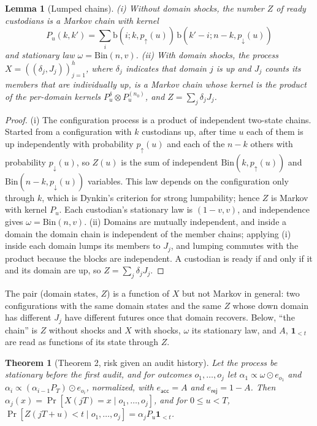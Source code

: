 \documentclass[11pt]{article}
\newtheorem*{lemmaS}{Lemma}
\newtheorem*{theoremS}{Theorem}
\begin{document}
\begin{lemmaS}[Lumped chains]
(i) Without domain shocks, the number $Z$ of ready custodians is a Markov chain with kernel
\[
P_u(k,k')=\sum_i\mathrm{b}(i;k,p_{\uparrow}(u))\,\mathrm{b}(k'-i;n-k,p_{\downarrow}(u))
\]
and stationary law $\omega=\mathrm{Bin}(n,v)$. (ii) With domain shocks, the process $X=((\delta_j,J_j))_{j=1}^{h}$, where $\delta_j$ indicates that domain $j$ is up and $J_j$ counts its members that are individually up, is a Markov chain whose kernel is the product of the per-domain kernels $P^{\delta}_u\otimes P^{(n_0)}_u$, and $Z=\sum_j\delta_jJ_j$.
\end{lemmaS}

\begin{proof}
(i) The configuration process is a product of independent two-state chains. Started from a configuration with $k$ custodians up, after time $u$ each of them is up independently with probability $p_{\uparrow}(u)$ and each of the $n-k$ others with probability $p_{\downarrow}(u)$, so $Z(u)$ is the sum of independent $\mathrm{Bin}(k,p_{\uparrow}(u))$ and $\mathrm{Bin}(n-k,p_{\downarrow}(u))$ variables. This law depends on the configuration only through $k$, which is Dynkin's criterion for strong lumpability; hence $Z$ is Markov with kernel $P_u$. Each custodian's stationary law is $(1-v,v)$, and independence gives $\omega=\mathrm{Bin}(n,v)$. (ii) Domains are mutually independent, and inside a domain the domain chain is independent of the member chains; applying (i) inside each domain lumps its members to $J_j$, and lumping commutes with the product because the blocks are independent. A custodian is ready if and only if it and its domain are up, so $Z=\sum_j\delta_jJ_j$.
\end{proof}

\noindent The pair (domain states, $Z$) is a function of $X$ but not Markov in general: two configurations with the same domain states and the same $Z$ whose down domain has different $J_j$ have different futures once that domain recovers. Below, ``the chain'' is $Z$ without shocks and $X$ with shocks, $\omega$ its stationary law, and $A$, $\mathbf{1}_{<t}$ are read as functions of its state through $Z$.

\begin{theoremS}[Theorem 2, risk given an audit history]
Let the process be stationary before the first audit, and for outcomes $o_1,\dots,o_j$ let $\alpha_1\propto\omega\odot e_{o_1}$ and $\alpha_i\propto(\alpha_{i-1}P_T)\odot e_{o_i}$, normalized, with $e_{\mathsf{acc}}=A$ and $e_{\mathsf{rej}}=1-A$. Then $\alpha_j(x)=\Pr[X(jT)=x\mid o_1,\dots,o_j]$, and for $0\le u<T$, $\Pr[Z(jT+u)<t\mid o_1,\dots,o_j]=\alpha_jP_u\mathbf{1}_{<t}$.
\end{theoremS}
\end{document}
